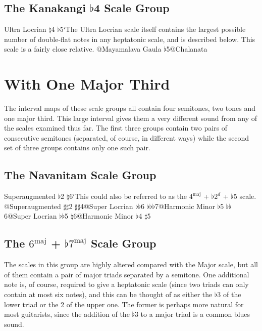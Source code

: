 \documentclass[english]{./gbook}
\begin{document}
\begin{large}
\subsection{The Kanakangi $\flat$4 Scale Group}
Ultra Locrian $\natural$4 $\flat$5`The Ultra Locrian scale itself contains the largest possible number of double-flat notes in any heptatonic scale, and is described below. This scale is a fairly close relative.
@Mayamalava Gaula $\flat$5@Chalanata%


\section{With One Major Third}

The interval maps of these scale groups all contain four semitones, two tones and one major third. This large interval gives them a very different sound from any of the scales examined thus far. The first three groups contain two pairs of consecutive semitones (separated, of course, in different ways) while the second set of three groups contains only one such pair.

\subsection{The Navanitam Scale Group}
Superaugmented $\flat$2 $\natural$6`This could also be referred to as the $4^{\text{maj}}$ + $\flat 2^d$ + $\flat$5 scale.
@Superaugmented $\sharp\sharp$2 $\sharp\sharp$4@Super Locrian $\flat\flat$6 $\flat\flat\flat$7@Harmonic Minor $\flat$5 $\flat\flat$6@Super Locrian $\flat\flat$5 $\natural$6@Harmonic Minor $\flat$4 $\sharp$5%

\subsection{The $6^{\text{maj}}$ + $\flat 7^{\text{maj}}$ Scale Group}
The scales in this group are highly altered compared with the Major scale, but all of them contain a pair of major triads separated by a semitone. One additional note is, of course, required to give a heptatonic scale (since two triads can only contain at most six notes), and this can be thought of as  either the $\flat$3 of the lower triad or the 2 of the upper one. The former is perhaps more natural for most guitarists, since the addition of the $\flat$3 to a major triad is a common blues sound. 


\end{large}
\end{document}
